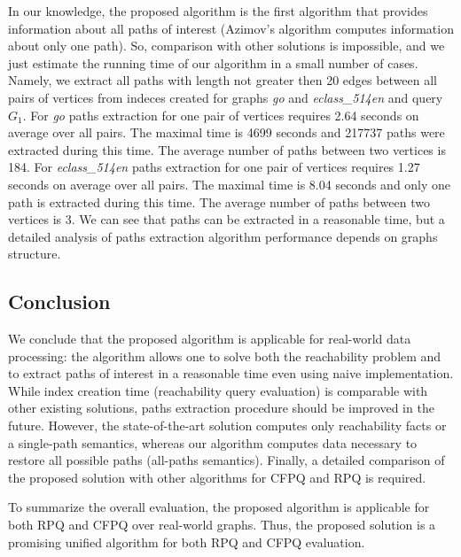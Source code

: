 In our knowledge, the proposed algorithm is the first algorithm that provides information about all paths of interest (Azimov's algorithm computes information about only one path).
So, comparison with other solutions is impossible, and we just estimate the running time of our algorithm in a small number of cases. 
Namely, we extract all paths with length not greater then 20 edges between all pairs of vertices from indeces created for graphs \textit{go} and \textit{eclass\_514en} and query $G_1$.
For \textit{go} paths extraction for one pair of vertices requires 2.64 seconds on average over all pairs. The maximal time is 4699 seconds and 217737 paths were extracted during this time. The average number of paths between two vertices is 184.
For \textit{eclass\_514en} paths extraction for one pair of vertices requires 1.27 seconds on average over all pairs. The maximal time is 8.04 seconds and only one path is extracted during this time. The average number of paths between two vertices is 3.
We can see that paths can be extracted in a reasonable time, but a detailed analysis of paths extraction algorithm performance depends on graphs structure.


\subsection{Conclusion}

We conclude that the proposed algorithm is applicable for real-world data processing: the algorithm allows one to solve both the reachability problem and to extract paths of interest in a reasonable time even using naive implementation.
While index creation time (reachability query evaluation) is comparable with other existing solutions, paths extraction procedure should be improved in the future. However, the state-of-the-art solution computes only reachability facts or a single-path semantics, whereas our algorithm computes data necessary to restore all possible paths (all-paths semantics).
Finally, a detailed comparison of the proposed solution with other algorithms for CFPQ and RPQ is required.

To summarize the overall evaluation, the proposed algorithm is applicable for both RPQ and CFPQ over real-world graphs.
Thus, the proposed solution is a promising unified algorithm for both RPQ and CFPQ evaluation.
